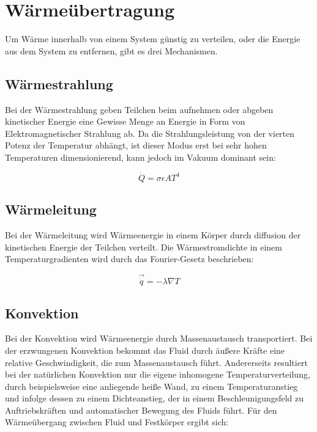 \section{Wärmeübertragung}\label{sec:waermeuebertragung}

Um Wärme innerhalb von einem System günstig zu verteilen, oder die Energie aus dem System zu entfernen, gibt es drei Mechanismen.

\subsection{Wärmestrahlung}\label{sec:strahlung}

Bei der Wärmestrahlung geben Teilchen beim aufnehmen oder abgeben kinetischer Energie eine Gewisse Menge an Energie in Form
von Elektromagnetischer Strahlung ab. Da die Strahlungsleistung von der vierten Potenz der Temperatur
abhängt, ist dieser Modus erst bei sehr hohen Temperaturen dimensionierend, kann jedoch im Vakuum dominant sein:

\begin{equation}
    \dot{Q}=\sigma\epsilon A T^{4}
\end{equation}

\subsection{Wärmeleitung}\label{sec:waermeleitung}

Bei der Wärmeleitung wird Wärmeenergie in einem Körper durch diffusion der kinetischen Energie der Teilchen verteilt.
Die Wärmestromdichte in einem Temperaturgradienten wird durch das Fourier-Gesetz beschrieben:

\begin{equation}
    \vec{\dot{q}} = -\lambda \nabla T
\end{equation}


\subsection{Konvektion}\label{sec:konvektion}

Bei der Konvektion wird Wärmeenergie durch Massenaustausch transportiert. Bei der erzwungenen Konvektion bekommt das Fluid durch äußere Kräfte
eine relative Geschwindigkeit, die zum Massenaustausch führt. Andererseits resultiert bei der natürlichen Konvektion nur die eigene
inhomogene Temperaturverteilung, durch beispielsweise eine anliegende heiße Wand, zu einem Temperaturanstieg und infolge dessen zu einem
Dichteanstieg, der in einem Beschleunigungsfeld zu Auftriebskräften und automatischer Bewegung des Fluids führt.
Für den Wärmeübergang zwischen Fluid und Festkörper ergibt sich:

